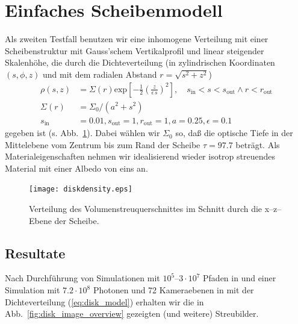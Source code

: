 	\section{Einfaches Scheibenmodell}
	Als zweiten Testfall benutzen wir eine inhomogene Verteilung mit einer Scheibenstruktur mit Gauss'schem Vertikalprofil und linear steigender Skalenhöhe, die durch die Dichteverteilung (in zylindrischen Koordinaten $(s,\phi,z)$ und mit dem radialen Abstand $r=\sqrt{s^2+z^2}$)
	\begin{align}
		\rho(s,z)&=\Sigma(r)\text{exp}\left[-\frac{1}{2}\left(\frac{z}{\epsilon\,s}\right)^2\right],\quad s_\text{in}<s<s_\text{out}\land r<r_\text{out} \nonumber\\
		\Sigma(r)&=\Sigma_0 / (a^2+s^2) \label{eq:disk_model} \\
		s_\text{in}&=0.01, s_\text{out}=1, r_\text{out}=1, a=0.25, \epsilon=0.1 \nonumber
	\end{align}
	gegeben ist (s. Abb.~\ref{fig:diskdensity}).	Dabei wählen wir $\Sigma_0$ so, daß die optische Tiefe in der Mittelebene vom Zentrum bis zum Rand der Scheibe $\tau=97.7$ beträgt. Als Materialeigenschaften nehmen wir idealisierend wieder isotrop streuendes Material mit einer Albedo von eins an.
	
		\begin{figure}
			\centering
			\texttt{[image: diskdensity.eps]}
			\caption{Verteilung des Volumenstreuquerschnittes im Schnitt durch die x--z--Ebene der Scheibe.}
			\label{fig:diskdensity}
		\end{figure}
	
	\subsection{Resultate}
		Nach Durchführung von Simulationen mit $10^5$--$3\cdot 10^7$ Pfaden in \pirate und einer Simulation mit $7.2\cdot 10^8$ Photonen und 72 Kameraebenen in \mctd mit der Dichteverteilung (\ref{eq:disk_model}) erhalten wir die in Abb.~\ref{fig:disk_image_overview} gezeigten (und weitere) Streubilder.
		
